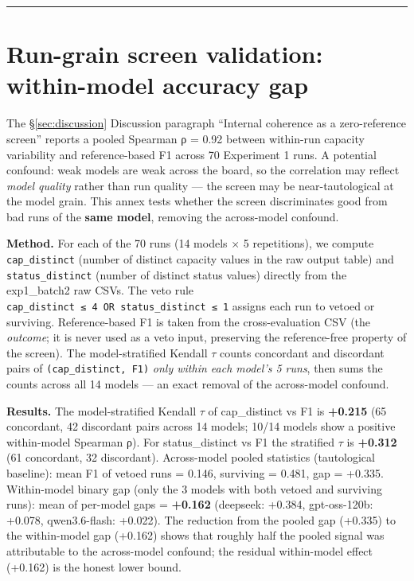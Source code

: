 \documentclass[a4paper,11pt]{article}
\begin{document}
\begin{center}\rule{0.5\linewidth}{0.5pt}\end{center}

\section{Run-grain screen validation: within-model accuracy
gap}\label{sec:annex-screen}

The §\ref{sec:discussion} Discussion paragraph ``Internal coherence as a
zero-reference screen'' reports a pooled Spearman ρ = 0.92 between
within-run capacity variability and reference-based F1 across 70
Experiment 1 runs. A potential confound: weak models are weak across the
board, so the correlation may reflect \emph{model quality} rather than
run quality --- the screen may be near-tautological at the model grain.
This annex tests whether the screen discriminates good from bad runs of
the \textbf{same model}, removing the across-model confound.

\textbf{Method.} For each of the 70 runs (14 models × 5 repetitions), we
compute \texttt{cap\_distinct} (number of distinct capacity values in
the raw output table) and \texttt{status\_distinct} (number of distinct
status values) directly from the exp1\_batch2 raw CSVs. The veto rule
\texttt{cap\_distinct\ ≤\ 4\ OR\ status\_distinct\ ≤\ 1} assigns each
run to vetoed or surviving. Reference-based F1 is taken from the
cross-evaluation CSV (the \emph{outcome}; it is never used as a veto
input, preserving the reference-free property of the screen). The
model-stratified Kendall \(\tau\) counts concordant and discordant pairs
of \texttt{(cap\_distinct,\ F1)} \emph{only within each model's 5 runs},
then sums the counts across all 14 models --- an exact removal of the
across-model confound.

\textbf{Results.} The model-stratified Kendall \(\tau\) of cap\_distinct
vs F1 is \textbf{+0.215} (65 concordant, 42 discordant pairs across 14
models; 10/14 models show a positive within-model Spearman ρ). For
status\_distinct vs F1 the stratified \(\tau\) is \textbf{+0.312} (61
concordant, 32 discordant). Across-model pooled statistics (tautological
baseline): mean F1 of vetoed runs = 0.146, surviving = 0.481, gap =
+0.335. Within-model binary gap (only the 3 models with both vetoed and
surviving runs): mean of per-model gaps = \textbf{+0.162} (deepseek:
+0.384, gpt-oss-120b: +0.078, qwen3.6-flash: +0.022). The reduction from
the pooled gap (+0.335) to the within-model gap (+0.162) shows that
roughly half the pooled signal was attributable to the across-model
confound; the residual within-model effect (+0.162) is the honest lower
bound.
\end{document}
